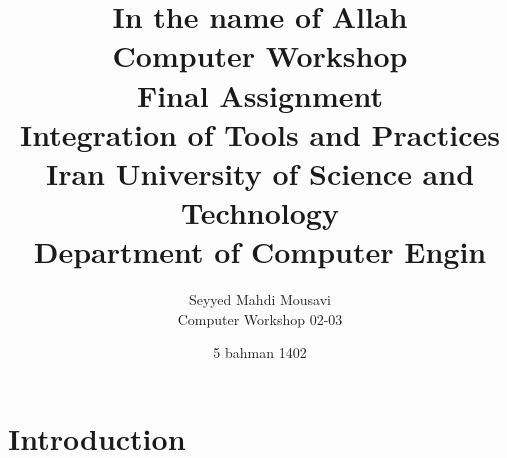 \documentclass[titlepage]{article}
\title{
    \textbf{\Huge In the name of Allah}\\
    \vspace{2in}
    \textbf{Computer Workshop}\\
    Final Assignment\\
    Integration of Tools and Practices\\
    \vspace{0.1in}
    \large Iran University of Science and Technology\\
    \large Department of Computer Engin
    \vspace{0.5in}
}
\author{
    \vspace{0.1in}
    Seyyed Mahdi Mousavi\\
    Computer Workshop 02-03\\
    \vspace{0.2in}
}
\date{5 bahman 1402}
\begin{document}
\pagestyle{fancy}

\maketitle
\tableofcontents
\newpage

\maketitle

\section{Introduction}
\end{document}

